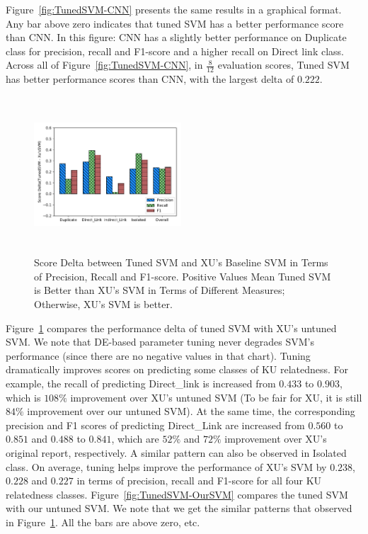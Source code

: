\documentclass[sigconf]{acmart}
\theoremstyle{break}
\newcommand{\fig}[1]{Figure~\ref{fig:#1}}
\begin{document}
\fig{TunedSVM-CNN} presents the same results in a graphical format.
Any bar above zero indicates that tuned SVM has
a better performance score than CNN.
In this figure: CNN has a slightly better performance on
{Duplicate} class for {precision}, {recall} and {F1-score} and
a higher {recall} on {Direct link} class.  Across all of \fig{TunedSVM-CNN},
in $\frac{8}{12}$ evaluation scores, Tuned SVM has better performance scores than CNN, with the largest delta of $0.222$.



 \begin{figure}[!t]
    \centering
     \includegraphics[width=0.49\textwidth,height=2.3in]{pic/TunedSVM-SVM.pdf} %
    \caption{Score Delta between Tuned SVM and XU's Baseline SVM in Terms of Precision, Recall and F1-score. Positive Values Mean
            Tuned SVM is Better than XU's SVM in Terms of Different Measures; Otherwise, XU's SVM is better.}
    \label{fig:TunedSVM-SVM}
\end{figure}

 
\fig{TunedSVM-SVM} compares the performance delta of tuned SVM with XU's untuned SVM.
 We note that DE-based parameter tuning never degrades SVM's performance
 (since there are no negative values in that chart). 
 Tuning dramatically improves scores on predicting some classes of KU relatedness. 
 For example, the {recall} of predicting {Direct\_link} is increased 
 from $0.433$ to $0.903$, which is $108\%$ improvement over XU's untuned SVM
 (To be fair for XU, it is still $84\%$ improvement over our untuned SVM).
 At the same time, the corresponding {precision} and {F1} scores of predicting {Direct\_Link} 
 are increased from $0.560$ to $0.851$ and $0.488$ to $0.841$, 
which are $52\%$ and $72\%$ improvement over XU's original report\cite{xu2016predicting}, respectively. 
 A similar pattern can also be observed in {Isolated} class. On average, tuning helps improve the performance
of XU's SVM by $0.238$, $0.228$ and $0.227$ in terms of {precision}, {recall} and {F1-score}
for all four KU relatedness classes. \fig{TunedSVM-OurSVM} compares the tuned SVM with our untuned SVM. We note that we get 
the similar patterns that observed in \fig{TunedSVM-SVM}. All the bars are above zero, etc.
\end{document}
